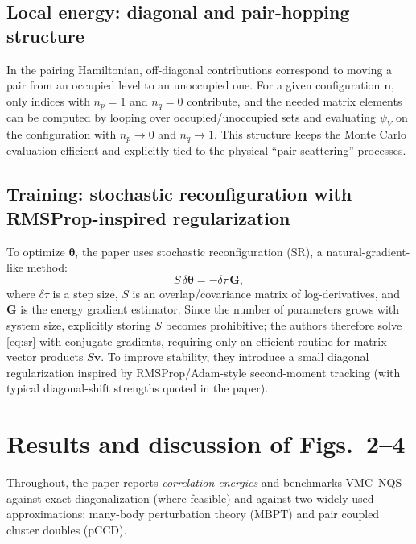 \subsection{Local energy: diagonal and pair-hopping structure}
In the pairing Hamiltonian, off-diagonal contributions correspond to moving a pair from an occupied level to an
unoccupied one. For a given configuration $\bm n$, only indices with $n_p=1$ and $n_q=0$ contribute, and the needed
matrix elements can be computed by looping over occupied/unoccupied sets and evaluating $\psi_V$ on the
configuration with $n_p\!\to 0$ and $n_q\!\to 1$. This structure keeps the Monte Carlo evaluation efficient and
explicitly tied to the physical ``pair-scattering'' processes. 

\subsection{Training: stochastic reconfiguration with RMSProp-inspired regularization}
To optimize $\bm\theta$, the paper uses stochastic reconfiguration (SR), a natural-gradient-like method:
\begin{equation}
S\,\delta\bm\theta=-\delta\tau\,\bm G,
\label{eq:sr}
\end{equation}
where $\delta\tau$ is a step size, $S$ is an overlap/covariance matrix of log-derivatives, and $\bm G$ is the energy
gradient estimator. Since the number of parameters grows with system size, explicitly storing $S$ becomes
prohibitive; the authors therefore solve \eqref{eq:sr} with conjugate gradients, requiring only an efficient routine for
matrix--vector products $S\bm v$. To improve stability, they introduce a small diagonal regularization inspired by
RMSProp/Adam-style second-moment tracking (with typical diagonal-shift strengths quoted in the paper). 

\section{Results and discussion of Figs.\ 2--4}
Throughout, the paper reports \emph{correlation energies} and benchmarks VMC--NQS against exact diagonalization
(where feasible) and against two widely used approximations: many-body perturbation theory (MBPT) and pair coupled
cluster doubles (pCCD). 

